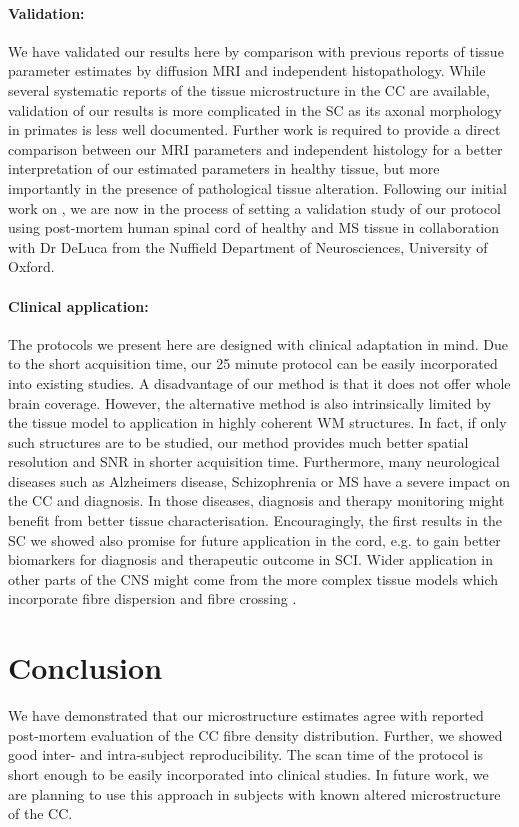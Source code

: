 \paragraph{Validation: } We have validated our results here by comparison with previous reports of tissue parameter estimates by diffusion MRI and independent histopathology. While several systematic reports of the tissue microstructure in the \gls{CC} are available, validation of our results is more complicated in the SC as its axonal morphology in primates is less well documented. Further work is required to provide a direct comparison between our MRI parameters and independent histology for a better interpretation of our estimated parameters in healthy tissue, but more importantly in the presence of pathological tissue alteration. Following our initial work on \SFasym{}, we are now in the process of setting a validation study of our protocol using post-mortem human spinal cord of healthy and MS tissue in collaboration with Dr DeLuca from the Nuffield Department of Neurosciences, University of Oxford.

\paragraph{Clinical application: } The protocols we present here are designed with clinical adaptation in mind. Due to the short acquisition time, our 25 minute protocol can be easily incorporated into existing studies. A disadvantage of our method is that it does not offer whole brain coverage. However, the alternative \OI{} method is also intrinsically limited by the tissue model to application in highly coherent WM structures. In fact, if only such structures are to be studied, our method provides much better spatial resolution and \gls{SNR} in shorter acquisition time. Furthermore, many neurological diseases such as Alzheimers disease, Schizophrenia or MS have a severe impact on the \gls{CC} and diagnosis. In those diseases, diagnosis and therapy monitoring might benefit from better tissue characterisation. Encouragingly, the first results in the SC we showed also promise for future application in the cord, e.g. to gain better biomarkers for diagnosis and therapeutic outcome in SCI. Wider application in other parts of the CNS might come from the more complex tissue models which incorporate fibre dispersion and fibre crossing \citep{Zhang:2011,Zhang:2011b,Sotiropoulos:2012,Zhang:2012}.

\section{Conclusion}
We have demonstrated that our microstructure estimates agree with reported post-mortem evaluation of the \gls{CC} fibre density distribution. Further, we showed good inter- and intra-subject reproducibility. The scan time of the protocol is short enough to be easily incorporated into clinical studies. In future work, we are planning to use this approach in subjects with known altered microstructure of the \gls{CC}.